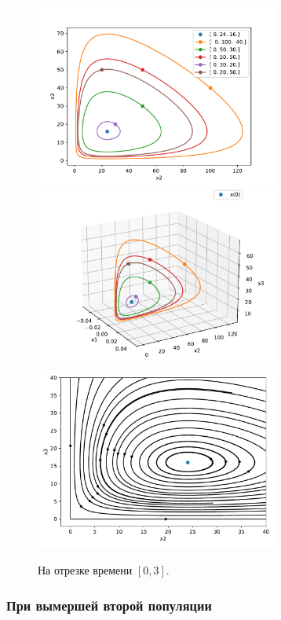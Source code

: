     \begin{figure}[H]
        \centering
        \includegraphics[width=8cm]{pictures/x1_0phase.pdf}
        \includegraphics[width=8cm]{pictures/x1_0phase3.pdf}
        \includegraphics[width=8cm]{pictures/x1_0vector.pdf}
        \caption{На отрезке времени \( [0, 3] \).}
    \end{figure}


    \subsubsection{При вымершей второй популяции}


